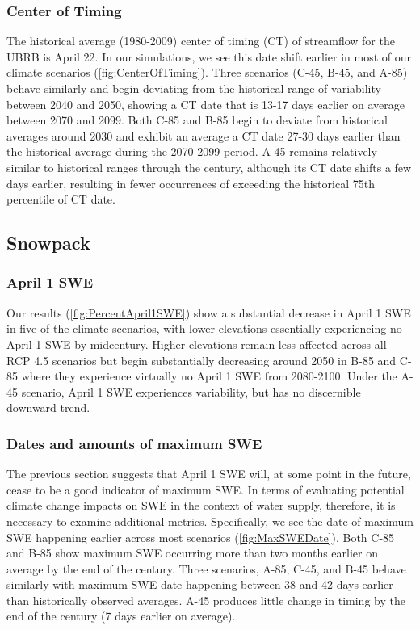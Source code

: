 \documentclass[water,article,submit,moreauthors,pdftex,10pt,a4paper]{mdpi}
\theoremstyle{mdpi}
\newcounter{ex}
\newcounter{re}
\theoremstyle{mdpidefinition}
\begin{document}
\subsubsection{Center of Timing}

The historical average (1980-2009) center of timing (CT) of streamflow for the UBRB is April 22. In our simulations, we see this date shift earlier in most of our climate scenarios (\cref{fig:CenterOfTiming}). Three scenarios (C-45, B-45, and A-85) behave similarly and begin deviating from the historical range of variability between 2040 and 2050, showing a CT date that is 13-17 days earlier on average between 2070 and 2099. Both C-85 and B-85 begin to deviate from historical averages around 2030 and exhibit an average a CT date 27-30 days earlier than the historical average during the 2070-2099 period. A-45 remains relatively similar to historical ranges through the century, although its CT date shifts a few days earlier, resulting in fewer occurrences of exceeding the historical 75th percentile of CT date. 

\subsection{Snowpack}

\subsubsection{April 1 SWE}

Our results (\cref{fig:PercentApril1SWE}) show a substantial decrease in April 1 SWE in five of the climate scenarios, with lower elevations essentially experiencing no April 1 SWE by midcentury. Higher elevations remain less affected across all RCP 4.5 scenarios but begin substantially decreasing around 2050 in B-85 and C-85 where they experience virtually no April 1 SWE from 2080-2100. Under the A-45 scenario, April 1 SWE experiences variability, but has no discernible downward trend. 

\subsubsection{Dates and amounts of maximum SWE}

The previous section suggests that April 1 SWE will, at some point in the future, cease to be a good indicator of maximum SWE. In terms of evaluating potential climate change impacts on SWE in the context of water supply, therefore, it is necessary to examine additional metrics. Specifically, we see the date of maximum SWE happening earlier across most scenarios (\cref{fig:MaxSWEDate}). Both C-85 and B-85 show maximum SWE occurring more than two months earlier on average by the end of the century. Three scenarios, A-85, C-45, and B-45 behave similarly with maximum SWE date happening between 38 and 42 days earlier than historically observed averages. A-45 produces little change in timing by the end of the century (7 days earlier on average). 
\end{document}
